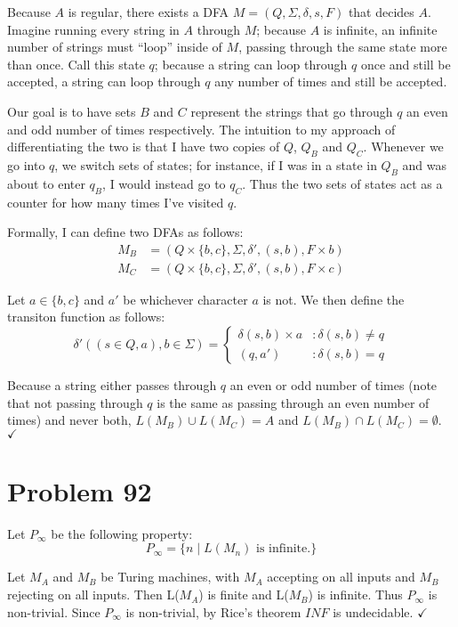 \documentclass[11pt]{article}
\begin{document}
Because $A$ is regular, there exists a DFA $M = (Q, \Sigma, \delta, s, F)$ that decides $A$.
Imagine running every string in $A$ through $M$; because $A$ is infinite, an infinite number of strings must ``loop'' inside of $M$, passing through the same state more than once. Call this state $q$; because a string can loop through $q$ once and still be accepted, a string can loop through $q$ any number of times and still be accepted.

Our goal is to have sets $B$ and $C$ represent the strings that go through $q$ an even and odd number of times respectively. The intuition to my approach of differentiating the two is that I have two copies of $Q$, $Q_B$ and $Q_C$. Whenever we go into $q$, we switch sets of states; for instance, if I was in a state in $Q_B$ and was about to enter $q_B$, I would instead go to $q_C$. Thus the two sets of states act as a counter for how many times I've visited $q$.

Formally, I can define two DFAs as follows:
\begin{align*}
	M_B &= (Q \times \{b, c\}, \Sigma, \delta', (s, b), F \times b) \\
	M_C &= (Q \times \{b, c\}, \Sigma, \delta', (s, b), F \times c)
\end{align*}

Let $a \in \{b, c\}$ and $a'$ be whichever character $a$ is not.
We then define the transiton function as follows:
\begin{displaymath}
   \delta'((s \in Q,a), b \in \Sigma) = \left\{
     \begin{array}{lr}
       \delta(s, b) \times a & : \delta(s, b) \neq q\\
       (q, a') & : \delta(s, b) = q
     \end{array}
   \right.
\end{displaymath}

Because a string either passes through $q$ an even or odd number of times (note that not passing through $q$ is the same as passing through an even number of times) and never both, $L(M_B) \cup L(M_C) = A$ and $L(M_B) \cap L(M_C) = \emptyset$. $\checkmark$

\section*{Problem 92}

Let $P_\infty$ be the following property:
	\[ P_\infty = \{ n \mid L(M_n) \text{ is infinite}. \}\] 

Let $M_A$ and $M_B$ be Turing machines, with $M_A$ accepting on all inputs and $M_B$ rejecting on all inputs.
Then L($M_A$) is finite and L($M_B$) is infinite. 
Thus $P_\infty$ is non-trivial.
Since $P_\infty$ is non-trivial, by Rice's theorem $INF$ is undecidable. $\checkmark$
\end{document}
